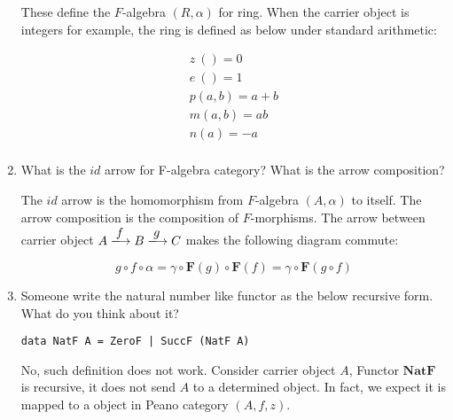 \documentclass[UTF8]{article}
\begin{document}
\begin{enumerate}
These define the $F$-algebra $(R, \alpha)$ for ring. When the carrier object is integers for example, the ring is defined as below under standard arithmetic:

\[\begin{array}{l}
z\ () = 0 \\
e\ () = 1 \\
p(a, b) = a + b \\
m(a, b) = ab \\
n(a) = -a \\
\end{array}\]

\item{What is the $id$ arrow for F-algebra category? What is the arrow composition?}

The $id$ arrow is the homomorphism from $F$-algebra $(A, \alpha)$ to itself. The arrow composition is the composition of $F$-morphisms. The arrow between carrier object $A \arrowto{f} B \arrowto{g} C$ makes the following diagram commute:

\begin{center}
\end{center}

\[
  g \circ f \circ \alpha = \gamma \circ \mathbf{F}(g) \circ \mathbf{F}(f) = \gamma \circ \mathbf{F}(g \circ f)
\]

\item{Someone write the natural number like functor as the below recursive form. What do you think about it?
\begin{lstlisting}
data NatF A = ZeroF | SuccF (NatF A)
\end{lstlisting}
}

No, such definition does not work. Consider carrier object $A$, Functor $\mathbf{NatF}$ is recursive, it does not send $A$ to a determined object. In fact, we expect it is mapped to a object in Peano category $(A, f, z)$.


\end{enumerate}
\end{document}
